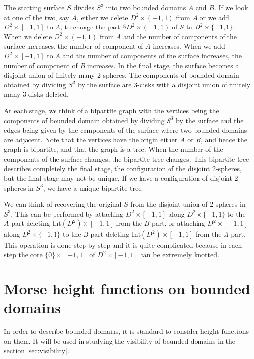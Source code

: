\documentclass{amsart}
\numberwithin{equation}{section}
\newcommand{\op}{\mathrm}
\newcommand{\bd}{\partial}
\begin{document}
The starting surface $S$ divides $S^3$ into two bounded domains $A$ and $B$. 
If we look at one of the two, say $A$, either we delete $D^2\times (-1,1)$ from $A$ or we add $D^2\times [-1,1]$ to $A$, to change the part $\bd D^2\times (-1,1)$ of $S$ to $D^2\times \{-1,1\}$.
When we delete $D^2\times (-1,1)$ from $A$ and the number of components of the surface increases, 
the number of component of $A$ increases.
When we add $D^2\times [-1,1]$ to $A$ and the number of components of the surface increases, the number of component of $B$ increases. 
In the final stage, the surface becomes a disjoint union of finitely many 2-spheres. The components of bounded domain obtained by dividing $S^3$ by the surface are 3-disks with a disjoint union of finitely many 3-disks deleted.

At each stage, we think of a bipartite graph with the vertices being the components of bounded domain obtained by dividing $S^3$ by the surface and the edges being given by the components of the surface where two bounded domains are adjacent.  
Note that the vertices have the origin either $A$ or $B$, and hence the graph is bipartite, and that the graph is a tree.  When the number of the components of the surface changes, the bipartite tree changes. This bipartite tree describes completely the final stage, the configuration of the disjoint 2-spheres, but the final stage may not be unique. If we have a configuration of disjoint 2-spheres in $S^3$, we have a unique bipartite tree. 

We can think of recovering the original $S$ from the disjoint union of 2-spheres in $S^3$. 
This can be performed by attaching $D^2\times [-1,1]$ along $D^2\times\{-1,1\}$ to 
 the $A$ part deleting $\op{Int}(D^2)\times [-1,1]$ from the $B$ part, or 
attaching $D^2\times [-1,1]$ along $D^2\times\{-1,1\}$ to 
 the $B$ part deleting $\op{Int}(D^2)\times [-1,1]$ from the $A$ part.
This operation is done step by step and it is quite complicated because in each step the core $\{0\}\times [-1,1]$ of $D^2\times [-1,1]$ can be extremely knotted.  

\section{Morse height functions on bounded domains}
\label{sec:Morse_height_function}

In order to describe bounded domains, it is standard to consider height functions on them. It will be used in studying the visibility of bounded domains in the section \ref{sec:visibility}.
\end{document}
